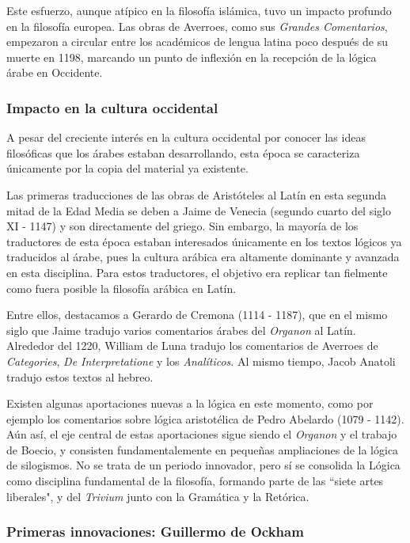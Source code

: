 \documentclass{article}
\begin{document}
Este esfuerzo, aunque atípico en la filosofía islámica, tuvo un impacto profundo en la filosofía europea. Las obras de Averroes, como sus \textit{Grandes Comentarios}, empezaron a circular entre los académicos de lengua latina poco después de su muerte en 1198, marcando un punto de inflexión en la recepción de la lógica árabe en Occidente\cite{street2001arabic, charles2004latin}.


\subsubsection{Impacto en la cultura occidental}

A pesar del creciente interés en la cultura occidental por conocer las ideas filosóficas que los árabes estaban desarrollando, esta época se caracteriza únicamente por la copia del material ya existente.

Las primeras traducciones de las obras de Aristóteles al Latín en esta segunda mitad de la Edad Media se deben a Jaime de Venecia (segundo cuarto del siglo XI - 1147) y son directamente del griego. Sin embargo, la mayoría de los traductores de esta época estaban interesados únicamente en los textos lógicos ya traducidos al árabe, pues la cultura arábica era altamente dominante y avanzada en esta disciplina. Para estos traductores, el objetivo era replicar tan fielmente como fuera posible la filosofía arábica en Latín.

Entre ellos, destacamos a Gerardo de Cremona (1114 - 1187), que en el mismo siglo que Jaime tradujo varios comentarios árabes del \textit{Organon} al Latín. Alrededor del 1220, William de Luna tradujo los comentarios de Averroes de \textit{Categories}, \textit{De Interpretatione} y los \textit{Analíticos}. Al mismo tiempo, Jacob Anatoli tradujo estos textos al hebreo\cite{charles2004latin}.

Existen algunas aportaciones nuevas a la lógica en este momento, como por ejemplo los comentarios sobre lógica aristotélica de Pedro Abelardo (1079 - 1142). Aún así, el eje central de estas aportaciones sigue siendo el \textit{Organon} y el trabajo de Boecio, y consisten fundamentalemente en pequeñas ampliaciones de la lógica de silogismos. No se trata de un periodo innovador, pero sí se consolida la Lógica como disciplina fundamental de la filosofía\cite{marebon2008logic}, formando parte de las ``siete artes liberales", y del \textit{Trivium} junto con la Gramática y la Retórica\cite{dutilh2008logic}.

\subsubsection{Primeras innovaciones: Guillermo de Ockham}
\end{document}
